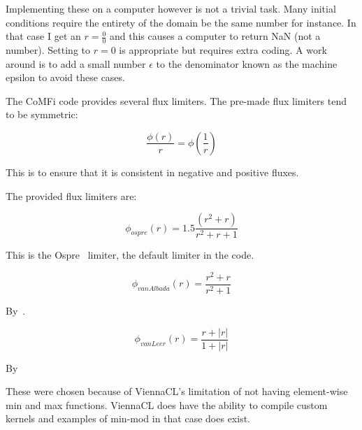 \documentclass[12pt,upcase]{umlthesis}
\begin{document}
Implementing these on a computer however is not a trivial task. Many initial conditions require the entirety of the domain be the same number for instance. In that case I get an $r = \frac{0}{0}$ and this causes a computer to return NaN (not a number). Setting to $r=0$ is appropriate but requires extra coding. A work around is to add a small number $\epsilon$ to the denominator known as the machine epsilon to avoid these cases.

The CoMFi code provides several flux limiters. The pre-made flux limiters tend to be symmetric:

\begin{equation}
	\frac{\phi(r)}{r} = \phi(\frac{1}{r})
\end{equation}

This is to ensure that it is consistent in negative and positive fluxes.

The provided flux limiters are:

\begin{equation}
	\phi_{ospre} (r) = 1.5 \frac{(r^2 + r)}{r^2 + r + 1}
\end{equation}

This is the Ospre~\citep{Waterson2007} limiter, the default limiter in the code.

\begin{equation}
	\phi_{van Albada} (r) = \frac{r^2 + r}{r^2 + 1}
\end{equation}

By~\citet{vanalbada1982}.

\begin{equation}
	\phi_{van Leer} (r) = \frac{r + \lvert r \rvert}{1 + \lvert r \rvert}
\end{equation}

By~\citet{vanleer1974}

These were chosen because of ViennaCL's limitation of not having element-wise min and max functions. ViennaCL does have the ability to compile custom kernels and examples of min-mod in that case does exist.
\end{document}
